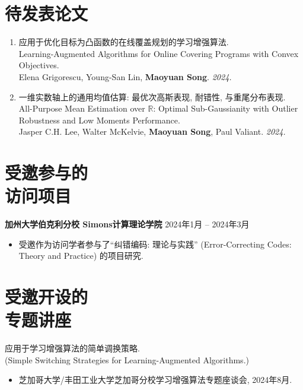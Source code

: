 \documentclass[margin, 10pt]{res-short} %
\begin{document}
\begin{resume}
\section{待发表论文}
\begin{enumerate}
\item 应用于优化目标为凸函数的在线覆盖规划的学习增强算法.\\
Learning-Augmented Algorithms for Online Covering Programs with Convex Objectives.\\
Elena Grigorescu, Young-San Lin, {\bf Maoyuan Song}. %
\emph{2024.}
\item 一维实数轴上的通用均值估算: 最优次高斯表现, 耐错性, 与重尾分布表现.\\
All-Purpose Mean Estimation over $\mathbb{R}$: Optimal Sub-Gaussianity with Outlier Robustness and Low Moments Performance.\\
Jasper C.H. Lee, Walter McKelvie, {\bf Maoyuan Song}, Paul Valiant. %
\emph{2024.}
\end{enumerate}


\section{受邀参与的\\访问项目}
{\bf 加州大学伯克利分校 Simons计算理论学院} \hfill 2024年1月 -- 2024年3月
\begin{itemize}
\item 受邀作为访问学者参与了``纠错编码: 理论与实践'' (Error-Correcting Codes: Theory and Practice) 的项目研究.
\end{itemize}

\section{受邀开设的\\专题讲座}
应用于学习增强算法的简单调换策略.\\
(Simple Switching Strategies for Learning-Augmented Algorithms.)
\begin{itemize}
\item 芝加哥大学/丰田工业大学芝加哥分校\;学习增强算法\;专题座谈会, 2024年8月.
\end{itemize}


\end{resume}
\end{document}
